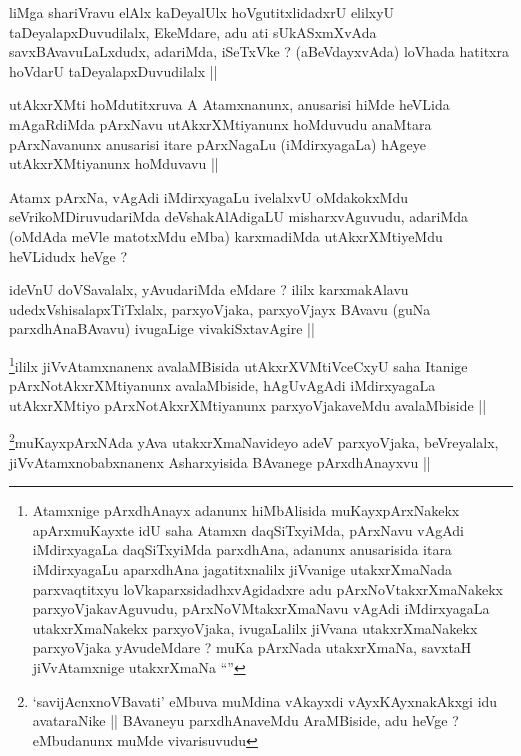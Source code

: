 \begin{artha}
liMga shariVravu elAlx kaDeyalUlx hoVgutitxlidadxrU elilxyU
taDeyalapxDuvudilalx, EkeMdare, adu ati sUkASxmXvAda
savxBAvavuLaLxdudx, adariMda, iSeTxVke ? (aBeVdayxvAda) loVhada
hatitxra hoVdarU taDeyalapxDuvudilalx || 
\end{artha}


\begin{artha}
utAkxrXMti hoMdutitxruva A Atamxnanunx, anusarisi hiMde heVLida
mAgaRdiMda pArxNavu utAkxrXMtiyanunx hoMduvudu anaMtara pArxNavanunx
anusarisi itare pArxNagaLu (iMdirxyagaLa) hAgeye utAkxrXMtiyanunx hoMduvavu ||
\end{artha}


\begin{artha}
Atamx pArxNa, vAgAdi iMdirxyagaLu ivelalxvU oMdakokxMdu
seVrikoMDiruvudariMda deVshakAlAdigaLU misharxvAguvudu, adariMda
(oMdAda meVle matotxMdu eMba) karxmadiMda utAkxrXMtiyeMdu heVLidudx
heVge ? 
\end{artha}

\begin{artha}
ideVnU doVSavalalx, yAvudariMda eMdare ? ililx karxmakAlavu
udedxVshisalapxTiTxlalx, parxyoVjaka, parxyoVjayx BAvavu (guNa
parxdhAnaBAvavu) ivugaLige vivakiSxtavAgire ||
\end{artha}

\begin{artha}
\footnote{Atamxnige pArxdhAnayx adanunx hiMbAlisida muKayxpArxNakekx
  apArxmuKayxte idU saha Atamxn daqSiTxyiMda, pArxNavu vAgAdi
  iMdirxyagaLa daqSiTxyiMda parxdhAna, adanunx anusarisida itara
  iMdirxyagaLu aparxdhAna jagatitxnalilx jiVvanige utakxrXmaNada
  parxvaqtitxyu loVkaparxsidadhxvAgidadxre adu pArxNoVtakxrXmaNakekx
  parxyoVjakavAguvudu, pArxNoVMtakxrXmaNavu vAgAdi iMdirxyagaLa
  utakxrXmaNakekx parxyoVjaka, ivugaLalilx jiVvana utakxrXmaNakekx
  parxyoVjaka yAvudeMdare ? muKa pArxNada utakxrXmaNa, savxtaH
  jiVvAtamxnige utakxrXmaNa ``\stext''}ililx jiVvAtamxnanenx avalaMBisida utAkxrXVMtiVceCxyU saha Itanige
pArxNotAkxrXMtiyanunx avalaMbiside, hAgUvAgAdi iMdirxyagaLa
utAkxrXMtiyo pArxNotAkxrXMtiyanunx parxyoVjakaveMdu avalaMbiside ||
\end{artha}

\begin{artha}
\footnote{`savijAcnxnoVBavati' eMbuva muMdina vAkayxdi
  vAyxKAyxnakAkxgi idu avataraNike  || BAvaneyu parxdhAnaveMdu
  AraMBiside, adu heVge ? eMbudanunx muMde vivarisuvudu}muKayxpArxNAda yAva utakxrXmaNavideyo adeV parxyoVjaka, beVreyalalx,
jiVvAtamxnobabxnanenx Asharxyisida BAvanege pArxdhAnayxvu ||
\end{artha}

